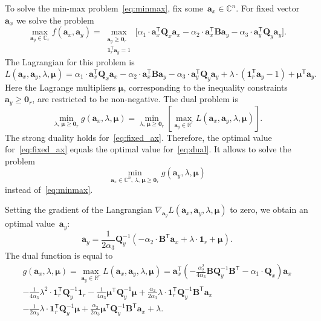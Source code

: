 \documentclass[12pt,twoside]{article}
\theoremstyle{definition}
\newcommand{\ba}{\mathbf{a}}
\newcommand{\bB}{\mathbf{B}}
\newcommand{\bQ}{\mathbf{Q}}
\newcommand{\bbR}{\mathbb{R}}
\newcommand{\T}{\mathsf{T}}
\newcommand{\bmu}{\boldsymbol{\mu}}
\newcommand{\bOne}{\boldsymbol{1}}
\newcommand{\bZero}{\boldsymbol{0}}
\begin{document}
To solve the min-max problem~\eqref{eq:minmax}, fix some~$\ba_x \in \mathbb{C}^n$. For fixed vector~$\ba_x$ we solve the problem
\begin{equation}
	\max_{\ba_y \in \mathbb{C}_r} f(\ba_x, \ba_y) = \max_{\substack{\ba_y \geq \bZero_r \\ \bOne_r^{\T}\ba_y=1}} \bigl[\alpha_1 \cdot \ba_x^{\T} \bQ_x \ba_x - \alpha_2 \cdot \ba_x^{\T} \bB \ba_y - \alpha_3 \cdot \ba_y^{\T} \bQ_y \ba_y \bigr].
	\label{eq:fixed_ax}
\end{equation}
The Lagrangian for this problem is
\[
	L(\ba_x, \ba_y, \lambda, \bmu) = \alpha_1 \cdot \ba_x^{\T} \bQ_x \ba_x - \alpha_2 \cdot \ba_x^{\T} \bB \ba_y - \alpha_3 \cdot \ba_y^{\T} \bQ_y \ba_y + \lambda \cdot  (\bOne_r^{\T} \ba_y - 1) + \bmu^{\T} \ba_y.
\]
Here the Lagrange multipliers $\bmu$, corresponding to the inequality constraints $\ba_y \geq \bZero_r$, are restricted to be non-negative.
The dual problem is
\begin{equation}
	\min_{\lambda, \, \bmu \geq \bZero_r} g(\ba_x, \lambda, \bmu) = \min_{\lambda, \, \bmu \geq \bZero_r}  \left[\max_{\ba_y \in \bbR^r} L(\ba_x, \ba_y, \lambda, \bmu) \right].
	\label{eq:dual}
\end{equation}
The strong duality holds for~\eqref{eq:fixed_ax}. Therefore, the optimal value for~\eqref{eq:fixed_ax} equals the optimal value for~\eqref{eq:dual}. It allows to solve the problem
\begin{equation}
	\min_{\ba_x \in \mathbb{C}^n, \, \lambda, \, \bmu \geq \bZero_r} g(\ba_y, \lambda, \bmu)
	\label{eq:dual_maxmin}
\end{equation}
instead of~\eqref{eq:minmax}.

Setting the gradient of the Langrangian $\nabla_{\ba_y} L(\ba_x, \ba_y, \lambda, \bmu)$ to zero, we obtain an optimal value~$\ba_y$:
\begin{equation}
	\ba_y = \frac{1}{2\alpha_3} \bQ_y^{-1} \left( - \alpha_2 \cdot \bB^{\T} \ba_x +\lambda \cdot \bOne_r + \bmu \right).
	\label{eq:ax}
\end{equation}
The dual function is equal to
\begin{multline}
	g(\ba_x, \lambda, \bmu)
	= \max_{\ba_y \in \bbR^r} L(\ba_x, \ba_y, \lambda, \bmu) =
	\ba_x^{\T} \left( - \frac{\alpha_2^2}{4\alpha_3} \bB \bQ_y^{-1} \bB^{\T} - \alpha_1 \cdot \bQ_x\right) \ba_x \\ - \frac{1}{4 \alpha_3} \lambda^2 \cdot \bOne_r^{\T} \bQ_y^{-1} \bOne_r - \frac{1}{4 \alpha_3} \bmu^{\T} \bQ_y^{-1} \bmu + \frac{\alpha_2}{2 \alpha_3} \lambda \cdot \bOne_r^{\T} \bQ_y^{-1} \bB^{\T} \ba_x \\ - \frac{1}{2 \alpha_3} \lambda \cdot \bOne_r^{\T} \bQ_y^{-1} \bmu + \frac{\alpha_2}{2 \alpha_3} \bmu^{\T} \bQ_y^{-1} \bB^{\T} \ba_x + \lambda.
	 \label{eq:dual_quadratic_form}
\end{multline}
\end{document}
